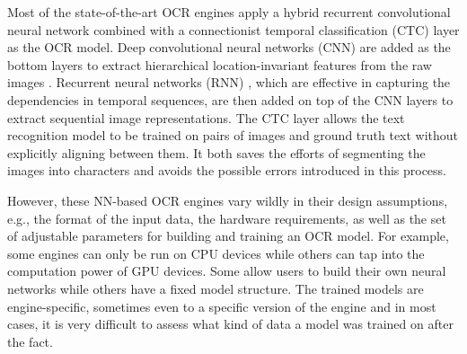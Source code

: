 \documentclass[conference]{IEEEtran}
\begin{document}
Most of the state-of-the-art OCR engines apply a hybrid recurrent convolutional
neural network combined with a connectionist temporal classification (CTC)
\cite{graves2006connectionist} layer as the OCR model. Deep convolutional
neural networks (CNN) \cite{krizhevsky2012imagenet} are added as the bottom
layers to extract hierarchical location-invariant features from the raw images
\cite{wick2018improving}. Recurrent neural networks (RNN)
\cite{mikolov2010recurrent}, which are effective in capturing the dependencies
in temporal sequences, are then added on top of the CNN layers to extract
sequential image representations. The CTC layer allows the text recognition
model to be trained on pairs of images and ground truth text without explicitly
aligning between them. It both saves the efforts of segmenting the images into
characters and avoids the possible errors introduced in this process.



However, these NN-based OCR engines vary wildly in their design
assumptions, e.g., the format of the input data, the hardware
requirements, as well as the set of adjustable parameters for
building and training an OCR model. For example, some engines can
only be run on CPU devices while others can tap into the
computation power of GPU devices. Some allow users to build their
own neural networks while others have a fixed model structure. The
trained models are engine-specific, sometimes even to a specific
version of the engine and in most cases, it is very difficult to
assess what kind of data a model was trained on after the fact.
\end{document}

